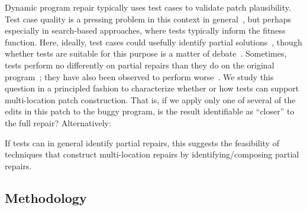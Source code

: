 \documentclass[10pt,journal,compsoc]{IEEEtran}
\begin{document}
Dynamic program repair typically uses test cases to validate patch plausibility. 
%
Test case quality is a pressing problem in this context in
general~\cite{Smith15fse}, but perhaps especially in search-based approaches,
where tests typically inform the fitness
function. Here, ideally, test cases could usefully identify partial
solutions~\cite{better-fitness}, 
though whether tests are suitable for this purpose is a matter of
debate~\cite{ae,rsrepair}.  Sometimes, tests perform no differently on partial
repairs than they do on the original program~\cite{chris-thesis,
  source-code-checkpoint}; they have also been observed to perform
worse~\cite{gecco09}.  
%
We study this question in a principled fashion to characterize whether or how
tests can support multi-location patch construction.  That is, if we apply only one of
several of the edits in this patch to the buggy program, is the result
identifiable as ``closer'' to the full repair? Alternatively:


If tests can in general identify partial repairs, this suggests the feasibility
of techniques that construct multi-location repairs by identifying/composing
partial repairs.



\subsection{Methodology}
\label{sec:partial-repair-methodology}
\end{document}
